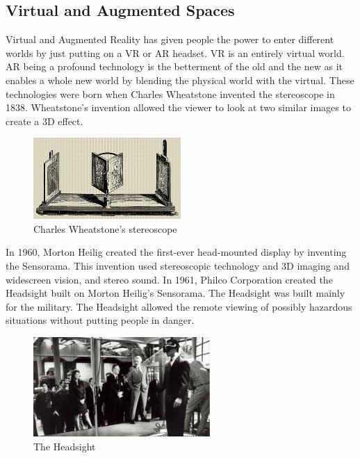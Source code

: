 \documentclass{article}
\begin{document}
\subsection{Virtual and Augmented Spaces}
Virtual and Augmented Reality has given people the power to enter different worlds by just putting on a VR or AR headset. VR is an entirely virtual world. AR being a profound technology is the betterment of the old and the new as it enables a whole new world by blending the physical world with the virtual. These technologies were born when Charles Wheatstone invented the stereoscope in 1838. Wheatstone’s invention allowed the viewer to look at two similar images to create a 3D effect.
\cite{ref11}

\begin{figure}[H]
    \caption{Charles Wheatstone’s stereoscope}
    \label{image:stereoscope}
    \centering
    \includegraphics[width=0.5\textwidth]{pics/stereoscope.jpg}
\end{figure}

In 1960, Morton Heilig created the first-ever head-mounted display by inventing the Sensorama. This invention used stereoscopic technology and 3D imaging and widescreen vision, and stereo sound. In 1961, Philco Corporation created the Headsight built on Morton Heilig’s Sensorama. The Headsight was built mainly for the military. The Headsight allowed the remote viewing of possibly hazardous situations without putting people in danger.
\cite{ref11}

\begin{figure}[H]
    \caption{The Headsight}
    \label{image:Headsight}
    \centering
    \includegraphics[width=0.6\textwidth]{pics/Headsight.jpg}
\end{figure}
\end{document}
